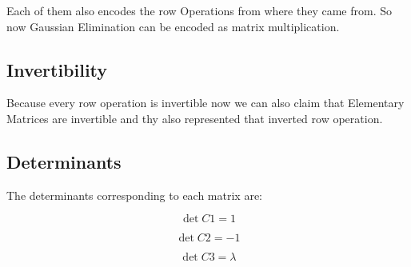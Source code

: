 Each of them also encodes the row Operations from where they came from.
So now Gaussian Elimination can be encoded as matrix multiplication.

\subsection{Invertibility}

Because every row operation is invertible now we can also claim that
Elementary Matrices are invertible and thy also represented that inverted row operation.


\subsection{Determinants}

The determinants corresponding to each matrix are:

\[\det C1 = 1\]

\[\det C2 = -1\]

\[\det C3 = \lambda\]

